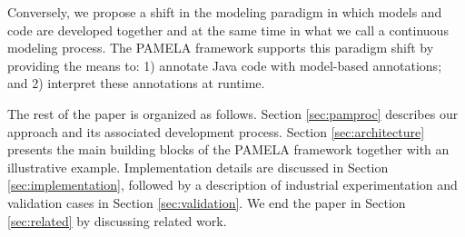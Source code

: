 Conversely, we propose a shift in the modeling paradigm in which models and code are developed together and at the same time in what we call a continuous modeling process. The PAMELA framework supports this paradigm shift by providing the means to: 1) annotate Java code with model-based annotations; and 2) interpret these annotations at runtime.


The rest of the paper is organized as follows. Section \ref{sec:pamproc} describes our approach and its associated development process. Section \ref{sec:architecture} presents the main building blocks of the PAMELA framework together with an illustrative example. Implementation details are discussed in Section \ref{sec:implementation}, followed by a description of industrial experimentation and validation cases in Section \ref{sec:validation}. We end the paper in Section \ref{sec:related} by discussing related work.


